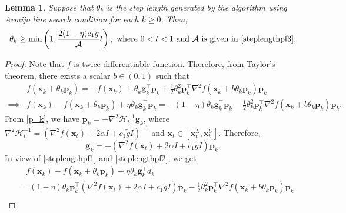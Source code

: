 \documentclass[10pt,a4paper]{amsart}
\newtheorem{lemma}{Lemma}
\begin{document}
\begin{lemma}\label{steplengthlemma}
    Suppose that $\theta_{k}$ is the step length generated by the algorithm using Armijo line search condition for each $k\geq0$. Then,  
    \begin{equation*}
    \theta_{k}\geq \min\left(1,\frac{2(1-\eta)c_1\tilde{g}}{\mathcal{A}}{t}\right),  \text{ where } 0<t<1 \text{ and } \mathcal{A} \text{ is given in }\eqref{steplengthpf3}.      
    \end{equation*}
\end{lemma}

\begin{proof}
    Note that $f$ is twice differentiable function. Therefore, from Taylor's theorem, there exists a scalar $b\in (0,1)$ such that 
    \begin{align}\label{steplengthpf1}
    &f(\mathbf{x}_{k}+\theta_{k}\mathbf{p}_k)=-f(\mathbf{x}_{k})+\theta_{k}\mathbf{g}^{\top}_{k}\mathbf{p}_{k}+\frac{1}{2} \theta^{2}_{k}\mathbf{p}^{\top}_{k} \nabla^{2} f(\mathbf{x}_{k}+b\theta_{k}\mathbf{p}_{k})\mathbf{p}_{k}\nonumber\\
    \implies& f(\mathbf{x}_{k})-f(\mathbf{x}_{k}+\theta_{k}\mathbf{p}_{k})+\eta\theta_{k}\mathbf{g}^{\top}_{k}\mathbf{p}_{k}=-(1-\eta)\theta_{k}\mathbf{g}^{\top}_{k}\mathbf{p}_{k}-\frac{1}{2} \theta^{2}_{k}\mathbf{p}^{\top}_{k}\nabla^{2}f(\mathbf{x}_{k}+b\theta_{k}\mathbf{p}_{k})\mathbf{p}_{k}.
    \end{align}
    From \eqref{p_k}, we have $\mathbf{p}_{k}=-\nabla^{2}\mathcal{H}^{-1}_{t}\mathbf{g}_k$, where  $\nabla^{2}\mathcal{H}^{-1}_{t}=(\nabla^{2} f(\mathbf{x}_{t})+2\alpha I+c_1\tilde g I)^{-1}$ and $\mathbf{x}_{t}\in
    [\mathbf{x}^{L}_{t}, \mathbf{x}^{U}_{t}]$. Therefore,
    \begin{equation}\label{steplengthpf2}
    \mathbf{g}_k=-(\nabla^{2} f(\mathbf{x}_{t})+2\alpha I+c_1\tilde g I)\mathbf{p}_{k}.
    \end{equation}
    In view of \eqref{steplengthpf1} and \eqref{steplengthpf2}, we get 
    \begin{align}\label{steplengthpf4}
        &~~~~f(\mathbf{x}_{k})-f(\mathbf{x}_{k}+\theta_{k}\mathbf{p}_{k})+\eta\theta_{k}\mathbf{g}^{\top}_{k}d_{k}\nonumber\\
        &= (1-\eta) \theta_{k} \mathbf{p}^{\top}_{k} (\nabla^{2} f(\mathbf{x}_{t})+2\alpha I+c_1\tilde g I)\mathbf{p}_{k}-\frac{1}{2} \theta^{2}_{k} \mathbf{p}^{\top}_{k}\nabla^{2} f(\mathbf{x}_{k}+b\theta_{k}\mathbf{p}_{k})\mathbf{p}_k\nonumber\\

\end{align}
\end{proof}
\end{document}
